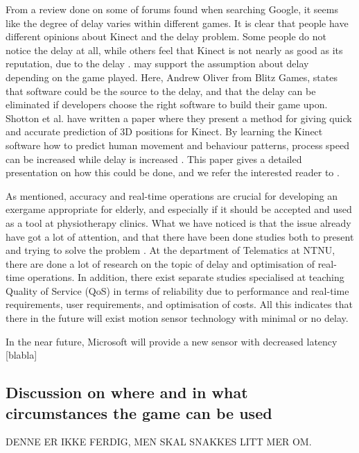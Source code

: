 From a review done on some of forums found when searching Google, it seems like the degree of delay varies within different games. It is clear that people have different opinions about Kinect and the delay problem. Some people do not notice the delay at all, while others feel that Kinect is not nearly as good as its reputation, due to the delay \cite{kinectLagForum1} \cite{kinectLagForum2}. \cite{kinectLag} may support the assumption about delay depending on the game played. Here, Andrew Oliver from Blitz Games, states that software could be the source to the delay, and that the delay can be eliminated if developers choose the right software to build their game upon. Shotton et al. have written a paper where they present a method for giving quick and accurate prediction of 3D positions for Kinect. By learning the Kinect software how to predict human movement and behaviour patterns, process speed can be increased while delay is increased \cite{artikkelKinectLag} \cite{artikkelKinectLagIntro}. This paper gives a detailed presentation on how this could be done, and we refer the interested reader to \cite{artikkelKinectLag}.       

As mentioned, accuracy and real-time operations are crucial for developing an exergame appropriate for elderly, and especially if it should be accepted and used as a tool at physiotherapy clinics. What we have noticed is that the issue already have got a lot of attention, and that there have been done studies both to present and trying to solve the problem \cite{artikkelKinectLag} \cite{leyvand2011kinect}. At the department of Telematics at NTNU, there are done a lot of research on the topic of delay and optimisation of real-time operations. In addition, there exist separate studies specialised at teaching Quality of Service (QoS) in terms of reliability due to performance and real-time requirements, user requirements, and optimisation of costs. All this indicates that there in the future will exist motion sensor technology with minimal or no delay. 

In the near future, Microsoft will provide a new sensor with decreased latency [blabla] 

\subsection{Discussion on where and in what circumstances the game can be used}
DENNE ER IKKE FERDIG, MEN SKAL SNAKKES LITT MER OM.
\label{subsec:whatwhere}

